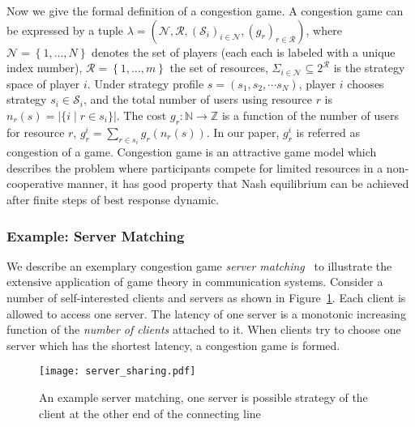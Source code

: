 



Now we give the formal definition of a congestion game.
A congestion game \cite{Rosenthal}\cite{Voecking06congestiongames} can be expressed by a tuple $\lambda=(\mathcal{N},\mathcal{R},(\mathcal{S}_i)_{i \in \mathcal{N}},(g_r)_{r\in \mathcal{R}})$, where $\mathcal{N}=\left\{1,\ldots,N\right\}$ denotes the set of players (each each is labeled with a unique index number), $\mathcal{R}=\left\{1,\ldots,m\right\}$ the set of resources, $\Sigma_{i\in\mathcal{N}} \subseteq 2^{\mathcal{R}}$ is the strategy space of player $i$. 
Under strategy profile $s=(s_1,s_2,\cdots s_N)$, player $i$ chooses strategy $s_i\in \mathcal{S}_i$, and the total number of users using resource $r$ is $n_r(s)=|\{i\mid r\in s_i\}|$. 
The cost $g_r: \mathbb{N}\rightarrow \mathbb{Z}$ is a function of the number of users for resource $r$, $g_r^i=\sum_{r\in s_i} g_r(n_r(s))$. 
In our paper, $g_r^i$ is referred as congestion of a game.
Congestion game is an attractive game model which describes the problem where participants compete for limited resources in a non-cooperative manner, it has good property that Nash equilibrium can be achieved after finite steps of best response dynamic.


\subsubsection*{Example: Server Matching}
We describe an exemplary congestion game \textit{server matching}~\cite{kothari:congestion_serverMatching} to illustrate the extensive application of game theory in communication systems.
Consider a number of self-interested clients and servers as shown in Figure~\ref{server_sharing}.
Each client is allowed to access one server.
The latency of one server is a monotonic increasing function of the \textit{number of clients} attached to it.
When clients try to choose one server which has the shortest latency, a congestion game is formed.
\begin{figure}[h!]
  \centering
  \texttt{[image: server\_sharing.pdf]}
  \caption{An example server matching, one server is possible strategy of the client at the other end of the connecting line}
\label{server_sharing}
\end{figure}


